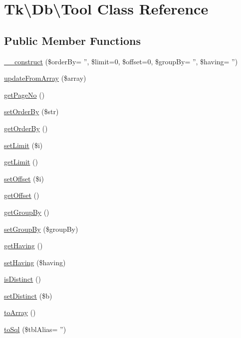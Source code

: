 \hypertarget{classTk_1_1Db_1_1Tool}{\section{Tk\textbackslash{}Db\textbackslash{}Tool Class Reference}
\label{classTk_1_1Db_1_1Tool}
}
\subsection*{Public Member Functions}
\begin{DoxyCompactItemize}
\item 
\hyperlink{classTk_1_1Db_1_1Tool_a0788e24f399921bdd6537070ee60785a}{\+\_\+\+\_\+construct} (\$order\+By= '', \$limit=0, \$offset=0, \$group\+By= '', \$having= '')
\item 
\hyperlink{classTk_1_1Db_1_1Tool_aead2a88176cb2f6b82ae8f7158b7b0a3}{update\+From\+Array} (\$array)
\item 
\hyperlink{classTk_1_1Db_1_1Tool_a1e066e6269f1fe8e5b5f07306ae60ce9}{get\+Page\+No} ()
\item 
\hyperlink{classTk_1_1Db_1_1Tool_a73628586fcf6a57126af21dd8e19f81a}{set\+Order\+By} (\$str)
\item 
\hyperlink{classTk_1_1Db_1_1Tool_a576e46b054e0fe2d347b15e26f166d72}{get\+Order\+By} ()
\item 
\hyperlink{classTk_1_1Db_1_1Tool_a12a18daac2cd5666dbdb50da863653c0}{set\+Limit} (\$i)
\item 
\hyperlink{classTk_1_1Db_1_1Tool_a953a59e9a67cfeea0c4393e7d1dbbdce}{get\+Limit} ()
\item 
\hyperlink{classTk_1_1Db_1_1Tool_a62dc5945e193379ad227036e53226352}{set\+Offset} (\$i)
\item 
\hyperlink{classTk_1_1Db_1_1Tool_aa6cca4b322481352859ded3670064f71}{get\+Offset} ()
\item 
\hyperlink{classTk_1_1Db_1_1Tool_a209676b3e27f3cb60e7fe17499f4a90c}{get\+Group\+By} ()
\item 
\hyperlink{classTk_1_1Db_1_1Tool_a0c8a631066198ada877a3c1128466e8d}{set\+Group\+By} (\$group\+By)
\item 
\hyperlink{classTk_1_1Db_1_1Tool_acec4d46bb96fdc1e770955773db5db29}{get\+Having} ()
\item 
\hyperlink{classTk_1_1Db_1_1Tool_aac8e1cff1a7c0649586bb2716f048a26}{set\+Having} (\$having)
\item 
\hyperlink{classTk_1_1Db_1_1Tool_a241069034d66d7c1b169912eb79ec58b}{is\+Distinct} ()
\item 
\hyperlink{classTk_1_1Db_1_1Tool_a735951c7254b900e53796957bf1039d2}{set\+Distinct} (\$b)
\item 
\hyperlink{classTk_1_1Db_1_1Tool_a47d0a6622be51b5fea0546ab5c8f9d72}{to\+Array} ()
\item 
\hyperlink{classTk_1_1Db_1_1Tool_a1552cee2bf62b0b20da7c0869a115bbe}{to\+Sql} (\$tbl\+Alias= '')
\end{DoxyCompactItemize}
